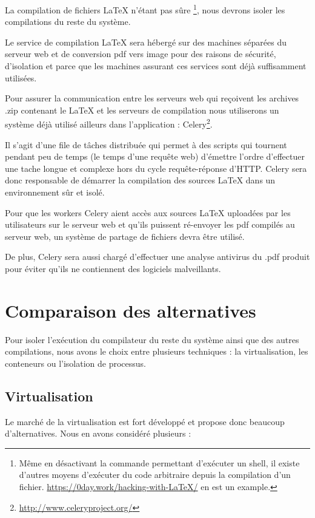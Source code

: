 \documentclass[10pt,a4paper]{article}
\begin{document}
La compilation de fichiers \LaTeX { }n'étant pas sûre \footnote{Même en désactivant la commande permettant d'exécuter un shell, il existe d'autres moyens d'exécuter du code arbitraire depuis la compilation d'un fichier.  \url{https://0day.work/hacking-with-LaTeX/} en est un example.}, nous devrons isoler les compilations du reste du système.

Le service de compilation \LaTeX { }sera hébergé sur des machines séparées du serveur web et de conversion pdf vers image pour des raisons de sécurité, d'isolation et parce que les machines assurant ces services sont déjà suffisamment utilisées.

Pour assurer la communication entre les serveurs web qui reçoivent les archives .zip contenant le \LaTeX { }et les serveurs de compilation nous utiliserons un système déjà utilisé ailleurs dans l'application :
Celery\footnote{\url{http://www.celeryproject.org/}}.

Il s'agit d'une file de tâches distribuée qui permet à des scripts qui tournent pendant peu de temps (le temps d'une requête web) d'émettre l'ordre d'effectuer une tache longue et complexe hors du cycle requête-réponse d'HTTP.
Celery sera donc responsable de démarrer la compilation des sources \LaTeX { }dans un environnement sûr et isolé.

Pour que les workers Celery aient accès aux sources \LaTeX { }uploadées par les utilisateurs sur le serveur web et qu'ils puissent ré-envoyer les pdf compilés au serveur web, un système de partage de fichiers devra être utilisé.

De plus, Celery sera aussi chargé d'effectuer une analyse antivirus du .pdf produit pour éviter qu'ils ne contiennent des logiciels malveillants.

\section{Comparaison des alternatives}
Pour isoler l'exécution du compilateur du reste du système ainsi que des autres compilations, nous avons le choix entre plusieurs techniques : la virtualisation, les conteneurs ou l'isolation de processus.

\subsection{Virtualisation}

Le marché de la virtualisation est fort développé et propose donc beaucoup d'alternatives. Nous en avons considéré plusieurs :
\end{document}
